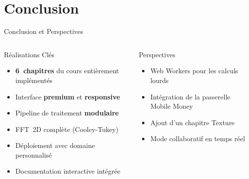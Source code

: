\documentclass[aspectratio=169, 11pt]{beamer}
\begin{document}
\section{Conclusion}

\begin{frame}{Conclusion et Perspectives}
  \begin{columns}[T]
    \begin{exampleblock}{Réalisations Clés}
      \begin{itemize}
        \item[$\checkmark$] \textbf{6~chapitres} du cours entièrement implémentés
        \item[$\checkmark$] Interface \textbf{premium} et \textbf{responsive}
        \item[$\checkmark$] Pipeline de traitement \textbf{modulaire}
        \item[$\checkmark$] FFT~2D complète (Cooley-Tukey)
        \item[$\checkmark$] Déploiement avec domaine personnalisé
        \item[$\checkmark$] Documentation interactive intégrée
      \end{itemize}
    \end{exampleblock}
    \vspace{4pt}
    \begin{alertblock}{Perspectives}
      \begin{itemize}
        \item Web Workers pour les calculs lourds
        \item Intégration de la passerelle Mobile Money
        \item Ajout d'un chapitre \og Texture \fg{}
        \item Mode collaboratif en temps réel
      \end{itemize}
    \end{alertblock}


\end{columns}
\end{frame}
\end{document}
